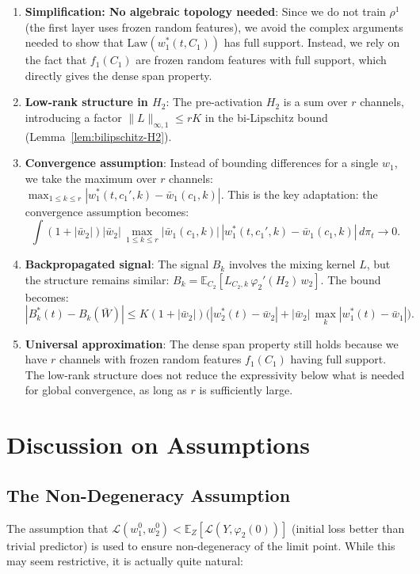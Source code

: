\documentclass[11pt]{article}
\newcommand{\E}{\mathbb{E}}
\newcommand{\1}{\mathbbm{1}}
\begin{document}
\begin{enumerate}
\item \textbf{Simplification: No algebraic topology needed}: Since we do not train $\rho^1$ (the first layer uses frozen random features), we avoid the complex arguments needed to show that $\text{Law}(w_1^*(t,C_1))$ has full support. Instead, we rely on the fact that $f_1(C_1)$ are frozen random features with full support, which directly gives the dense span property.

\item \textbf{Low-rank structure in $H_2$}: The pre-activation $H_2$ is a sum over $r$ channels, introducing a factor $\|L\|_{\infty,1}\le rK$ in the bi-Lipschitz bound (Lemma~\ref{lem:bilipschitz-H2}).

\item \textbf{Convergence assumption}: Instead of bounding differences for a single $w_1$, we take the maximum over $r$ channels: $\max_{1\le k\le r}|w_1^*(t,c_1',k)-\bar{w}_1(c_1,k)|$. This is the key adaptation: the convergence assumption becomes:
\[
\int (1+|\bar{w}_2|)|\bar{w}_2|\,\max_{1\le k\le r}|\bar{w}_1(c_1,k)|\,|w_1^*(t,c_1',k)-\bar{w}_1(c_1,k)|\,d\pi_t \to 0.
\]

\item \textbf{Backpropagated signal}: The signal $B_k$ involves the mixing kernel $L$, but the structure remains similar: $B_k = \E_{C_2}[L_{C_2,k}\,\varphi_2'(H_2)\,w_2]$. The bound becomes:
\[
|B_k^*(t)-B_k(\bar{W})| \le K(1+|\bar{w}_2|)\Big(|w_2^*(t)-\bar{w}_2| + |\bar{w}_2|\,\max_k|w_1^*(t)-\bar{w}_1|\Big).
\]

\item \textbf{Universal approximation}: The dense span property still holds because we have $r$ channels with frozen random features $f_1(C_1)$ having full support. The low-rank structure does not reduce the expressivity below what is needed for global convergence, as long as $r$ is sufficiently large.
\end{enumerate}

\section{Discussion on Assumptions}

\subsection{The Non-Degeneracy Assumption}

The assumption that $\mathscr{L}(w_1^0,w_2^0) < \E_Z[\mathcal{L}(Y,\varphi_2(0))]$ (initial loss better than trivial predictor) is used to ensure non-degeneracy of the limit point. While this may seem restrictive, it is actually quite natural:
\end{document}
